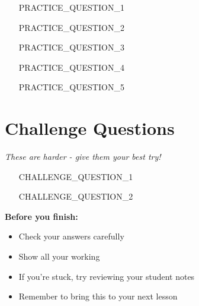 \documentclass[a4paper,12pt]{article}
\begin{document}
\begin{enumerate}[resume]
    \item [PRACTICE_QUESTION_1]
    
    \vspace{3cm}
    
    \item [PRACTICE_QUESTION_2]
    
    \vspace{3cm}
    
    \item [PRACTICE_QUESTION_3]
    
    \vspace{3cm}
    
    \item [PRACTICE_QUESTION_4]
    
    \vspace{3cm}
    
    \item [PRACTICE_QUESTION_5]
    
    \vspace{3cm}
\end{enumerate}

\section{Challenge Questions}
\textit{These are harder - give them your best try!}

\begin{enumerate}[resume]
    \item [CHALLENGE_QUESTION_1]
    
    \vspace{4cm}
    
    \item [CHALLENGE_QUESTION_2]
    
    \vspace{4cm}
\end{enumerate}

\begin{reminder}
\textbf{Before you finish:}
\begin{itemize}
    \item Check your answers carefully
    \item Show all your working
    \item If you're stuck, try reviewing your student notes
    \item Remember to bring this to your next lesson
\end{itemize}
\end{reminder}
\end{document}
